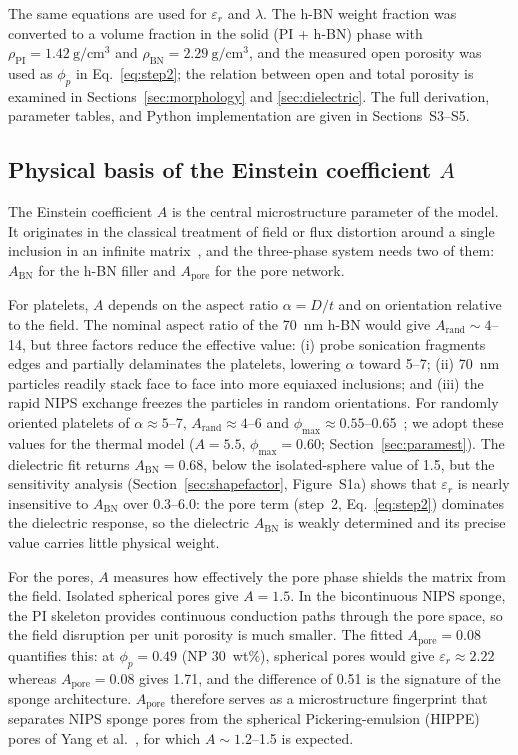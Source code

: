 \documentclass[preprint,a4paper]{elsarticle}
\newcommand{\eps}{\ensuremath{\varepsilon_r}}   %
\newcommand{\lam}{\ensuremath{\lambda}}
\newcommand{\phimax}{\ensuremath{\phi_{\max}}}
\newcommand{\Apore}{\ensuremath{A_{\mathrm{pore}}}}
\newcommand{\ABN}{\ensuremath{A_{\mathrm{BN}}}}
\begin{document}
The same equations are used for \eps{} and \lam. The h-BN weight fraction was converted to a volume fraction in the solid (PI + h-BN) phase with $\rho_{\mathrm{PI}} = \SI{1.42}{\gram\per\cm\cubed}$ and $\rho_{\mathrm{BN}} = \SI{2.29}{\gram\per\cm\cubed}$, and the measured open porosity was used as $\phi_p$ in Eq.~\ref{eq:step2}; the relation between open and total porosity is examined in Sections~\ref{sec:morphology} and \ref{sec:dielectric}. The full derivation, parameter tables, and Python implementation are given in Sections~S3--S5.

\subsection{Physical basis of the Einstein coefficient \texorpdfstring{$A$}{A}}
\label{sec:einstein}
The Einstein coefficient $A$ is the central microstructure parameter of the model. It originates in the classical treatment of field or flux distortion around a single inclusion in an infinite matrix~\cite{lewis1970dynamic,nielsen1973thermal}, and the three-phase system needs two of them: \ABN{} for the h-BN filler and \Apore{} for the pore network.

For platelets, $A$ depends on the aspect ratio $\alpha = D/t$ and on orientation relative to the field. The nominal aspect ratio of the \SI{70}{\nm} h-BN would give $A_{\mathrm{rand}} \sim 4$--14, but three factors reduce the effective value: (i) probe sonication fragments edges and partially delaminates the platelets, lowering $\alpha$ toward 5--7; (ii) \SI{70}{\nm} particles readily stack face to face into more equiaxed inclusions; and (iii) the rapid NIPS exchange freezes the particles in random orientations. For randomly oriented platelets of $\alpha \approx 5$--7, $A_{\mathrm{rand}} \approx 4$--6 and $\phimax \approx 0.55$--0.65~\cite{lewis1970dynamic,nielsen1973thermal,progelhof1976methods}; we adopt these values for the thermal model ($A = 5.5$, $\phimax = 0.60$; Section~\ref{sec:paramest}). The dielectric fit returns $\ABN = 0.68$, below the isolated-sphere value of 1.5, but the sensitivity analysis (Section~\ref{sec:shapefactor}, Figure~S1a) shows that \eps{} is nearly insensitive to \ABN{} over 0.3--6.0: the pore term (step~2, Eq.~\ref{eq:step2}) dominates the dielectric response, so the dielectric \ABN{} is weakly determined and its precise value carries little physical weight.

For the pores, $A$ measures how effectively the pore phase shields the matrix from the field. Isolated spherical pores give $A = 1.5$. In the bicontinuous NIPS sponge, the PI skeleton provides continuous conduction paths through the pore space, so the field disruption per unit porosity is much smaller. The fitted $\Apore = 0.08$ quantifies this: at $\phi_p = 0.49$ (NP 30~wt\%), spherical pores would give $\eps \approx 2.22$ whereas $\Apore = 0.08$ gives 1.71, and the difference of 0.51 is the signature of the sponge architecture. \Apore{} therefore serves as a microstructure fingerprint that separates NIPS sponge pores from the spherical Pickering-emulsion (HIPPE) pores of Yang et al.~\cite{yang2019porous}, for which $A \sim 1.2$--1.5 is expected.
\end{document}
